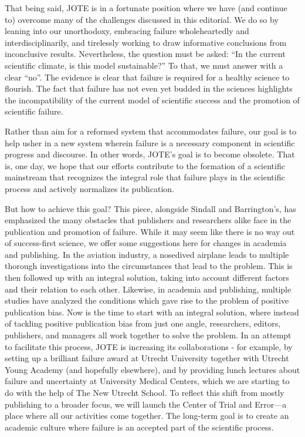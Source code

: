 \documentclass{article}
\begin{document}
That being said, JOTE is in a fortunate position where we have (and continue to) overcome many of the challenges discussed in this editorial. We do so by leaning into our unorthodoxy, embracing failure wholeheartedly and interdisciplinarily, and tirelessly working to draw informative conclusions from inconclusive results. Nevertheless, the question must be asked: “In the current scientific climate, is this model sustainable?” To that, we must answer with a clear “no”. The evidence is clear that failure is required for a healthy science to flourish. The fact that failure has not even yet budded in the sciences highlights the incompatibility of the current model of scientific success and the promotion of scientific failure. 

Rather than aim for a reformed system that accommodates failure, our goal is to help usher in a new system wherein failure is a necessary component in scientific progress and discourse. In other words, JOTE's goal is to become obsolete. That is, one day, we hope that our efforts contribute to the formation of a scientific mainstream that recognizes the integral role that failure plays in the scientific process and actively normalizes its publication. 

But how to achieve this goal? This piece, alongside Sindall and Barrington's, has emphasized the many obstacles that publishers and researchers alike face in the publication and promotion of failure. While it may seem like there is no way out of success-first science, we offer some suggestions here for changes in academia and publishing. In the aviation industry, a nosedived airplane leads to multiple thorough investigations into the circumstances that lead to the problem. This is then followed up with an integral solution, taking into account different factors and their relation to each other. Likewise, in academia and publishing, multiple studies have analyzed the conditions which gave rise to the problem of positive publication bias. Now is the time to start with an integral solution, where instead of tackling positive publication bias from just one angle, researchers, editors, publishers, and managers all work together to solve the problem. In an attempt to facilitate this process, JOTE is increasing its collaborations - for example, by setting up a brilliant failure award at Utrecht University together with Utrecht Young Academy (and hopefully elsewhere), and by providing lunch lectures about failure and uncertainty at University Medical Centers, which we are starting to do with the help of The New Utrecht School. To reflect this shift from mostly publishing to a broader focus, we will launch the Center of Trial and Error—a place where all our activities come together. The long-term goal is to create an academic culture where failure is an accepted part of the scientific process. 
\end{document}
